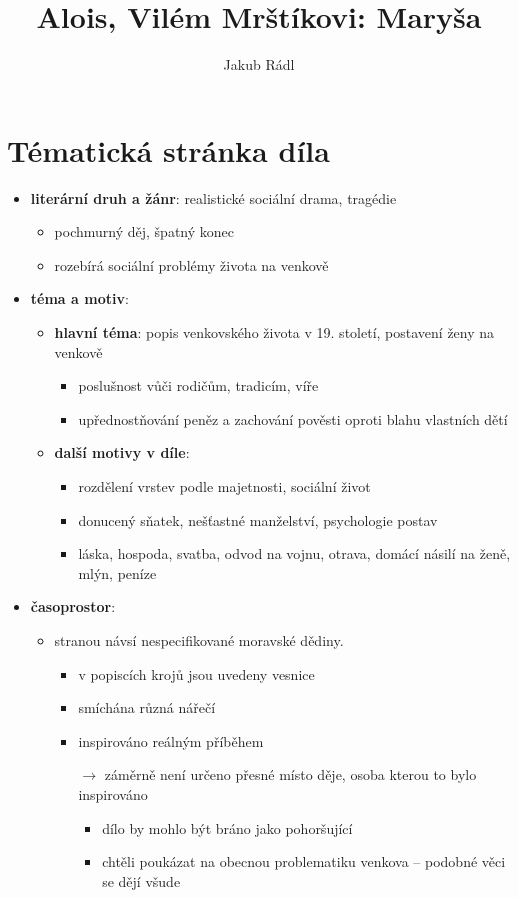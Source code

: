 \documentclass[10pt,a4paper]{article}
\date{}
\author{Jakub Rádl}
\title{Alois, Vilém Mrštíkovi: Maryša}
\newcommand{\ra}{$\rightarrow$ }
\begin{document}
\maketitle

\section*{Tématická stránka díla}
\begin{itemize}
\item \textbf{literární druh a žánr}: realistické sociální drama, tragédie
	\begin{itemize}
	\item pochmurný děj, špatný konec
	\item rozebírá sociální problémy života na venkově
	\end{itemize}
\item \textbf{téma a motiv}: 
	\begin{itemize}
	\item \textbf{hlavní téma}: popis venkovského života v 19. století, postavení ženy na venkově
		\begin{itemize}
		\item poslušnost vůči rodičům, tradicím, víře
		\item upřednostňování peněz a zachování pověsti oproti blahu vlastních dětí
		\end{itemize}
	\item \textbf{další motivy v díle}:
		\begin{itemize}
		\item rozdělení vrstev podle majetnosti, sociální život
		\item donucený sňatek, nešťastné manželství, psychologie postav
		\item láska, hospoda, svatba, odvod na vojnu, otrava, domácí násilí na ženě, mlýn, peníze
		\end{itemize}
	\end{itemize}
\item \textbf{časoprostor}:
	\begin{itemize}
	\item stranou návsí nespecifikované moravské dědiny.
		\begin{itemize}
		\item v popiscích krojů jsou uvedeny vesnice
		\item smíchána různá nářečí
		\item inspirováno reálným příběhem
		\item[\ra] záměrně není určeno přesné místo děje, osoba kterou to bylo inspirováno
			\begin{itemize}
			\item dílo by mohlo být bráno jako pohoršující
			\item chtěli poukázat na obecnou problematiku venkova -- podobné věci se dějí všude
			\end{itemize}
		

\end{itemize}
\end{itemize}
\end{itemize}
\end{document}
